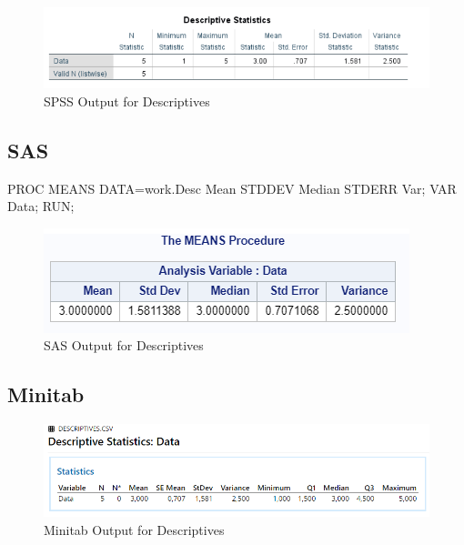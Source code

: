 \documentclass[
]{book}
\newenvironment{Shaded}{\begin{snugshade}}{\end{snugshade}}
\newcommand{\NormalTok}[1]{#1}
\begin{document}
\begin{figure}[!h]
\includegraphics{Screenshots/Descriptives/DescriptivesSPSS} \caption{\label{fig:descSPSS}SPSS Output for Descriptives}\label{fig:descSPSS}
\end{figure}

\hypertarget{sas}{%
\subsection{SAS}\label{sas}}

\begin{Shaded}
\begin{Highlighting}[]
\NormalTok{PROC MEANS DATA=work.Desc Mean STDDEV Median STDERR Var;}
\NormalTok{  VAR Data;}
\NormalTok{RUN;}
\end{Highlighting}
\end{Shaded}

\begin{figure}[!h]
\includegraphics{Screenshots/Descriptives/DescriptivesSAS} \caption{\label{fig:descSAS}SAS Output for Descriptives}\label{fig:descSAS}
\end{figure}

\hypertarget{minitab}{%
\subsection{Minitab}\label{minitab}}

\begin{figure}[!h]
\includegraphics{Screenshots/Descriptives/DescriptivesMinitab} \caption{\label{fig:descMinitb}Minitab Output for Descriptives}\label{fig:descMinitab}
\end{figure}
\end{document}
